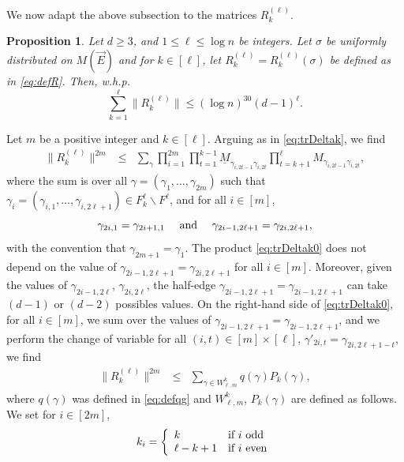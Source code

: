 \documentclass[11pt]{article}
\newtheorem{proposition}[lemma]{Proposition}
\newcommand{\PAR}[1]{{{\left(#1\right)}}} %
\newcommand{\1}{1\!\!{\sf I}}\newcommand{\IND}{\1}
\newcommand{\whp}{{w.h.p.~}}
\begin{document}
\label{subsec:Rlk}
We now adapt the above subsection to the matrices $R^{(\ell)}_{k}$. 
\begin{proposition} \label{prop:normR}
Let $d \geq 3$, and $1 \leq \ell \leq  \log n$ be integers.  Let $\sigma$ be uniformly distributed on $M(\vec E)$ and for $k \in [\ell]$, let $R_k^{(\ell)} = R_k^{(\ell)}(\sigma)$ be defined as in \eqref{eq:defR}. Then, \whp
$$ \sum_{k=1}^\ell \| R^{(\ell)}_{k} \| \leq ( \log n) ^{30}\PAR{ d - 1}^{\ell}.$$
\end{proposition}
Let $m$ be a positive integer and $k \in [\ell]$.  Arguing as in  \eqref{eq:trDeltak}, we find
\begin{eqnarray}
\|R^{(\ell)}_{k}  \| ^{2 m} & \leq  &  \sum_{\gamma }  \prod_{i=1}^{2m}  \prod_{t=1}^{k-1} \underline M_{\gamma_{i,2t-1}  \gamma_{i,2t}} \prod_{t=k+1}^{\ell}  M_{\gamma_{i,2t-1}  \gamma_{i,2t}}  ,  \label{eq:trDeltak0}
\end{eqnarray}
where the sum is over all  $\gamma = ( \gamma_1, \ldots, \gamma_{2m})$ such that $\gamma_i = (\gamma_{i,1}, \ldots, \gamma_{i,2\ell+1}) \in F^{\ell}_k \backslash F^\ell$,  and for all $i \in [m]$, 
$$
\gamma_{2i,1} = \gamma_{2i+1, 1} \quad \hbox{ and } \quad  \gamma_{2i-1,2\ell+1} = \gamma_{2i, 2\ell+1},
$$
with the convention that $\gamma_{2m+1} = \gamma_{1}$. The product \eqref{eq:trDeltak0} does not depend on the value of $\gamma_{2i-1,2\ell+1} = \gamma_{2i,2\ell+1}$ for all $i\in[m]$. Moreover, given the values of $\gamma_{2i-1,2\ell}$, $\gamma_{2i, 2 \ell}$, the half-edge $\gamma_{2i-1,2\ell+1} = \gamma_{2i-1,2\ell+1}$ can take $(d-1)$ or $(d-2)$ possibles values.  On the right-hand side of \eqref{eq:trDeltak0}, for all $i\in[m]$, we sum over the values of $ \gamma_{2i-1,2\ell+1} =  \gamma_{2i-1,2\ell+1} $, and we perform the change of variable for all $(i,t) \in [m]\times[\ell]$, $\gamma'_{2i,t} = \gamma_{2i, 2\ell +1 -t}$, we find
\begin{eqnarray}
\| R^{(\ell)}_{k}  \| ^{2 m}  &\leq & \sum_{\gamma \in W^k_{\ell,m}} q (\gamma)  P_k (\gamma), \label{eq:trDeltak20}
\end{eqnarray}
where $q(\gamma)$ was defined in \eqref{eq:defqg} and $W^k_{\ell,m}$, $P_k(\gamma)$ are defined as follows. We set for $i \in [2m]$, 
\begin{equation}\label{eq:defki}
k_i = \left\{ \begin{array}{ll} k & \hbox{if $i$ odd} \\
 \ell  - k +1 & \hbox{if $i$ even}
\end{array}\right.
\end{equation}
\end{document}
